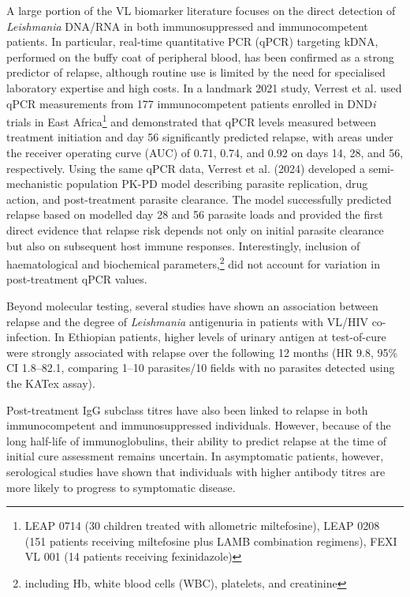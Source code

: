 A large portion of the VL biomarker literature focuses on the direct detection of \textit{Leishmania} DNA/RNA in both immunosuppressed\cite{antinori2007, bourgeois2008, cota2017, molina2013, nicodemo2013, verma2017} and immunocompetent patients\cite{hossain2017, mary2006, sudarshan2011, verrest2021, verrest2024}. In particular, real-time quantitative PCR (qPCR) targeting kDNA, performed on the buffy coat of peripheral blood, has been confirmed as a strong predictor of relapse\cite{hossain2017, sudarshan2011, verrest2021, verrest2024}, although routine use is limited by the need for specialised laboratory expertise and high costs. In a landmark 2021 study, Verrest et al. used qPCR measurements from 177 immunocompetent patients enrolled in DND\textit{i} trials in East Africa\footnote{LEAP 0714 (30 children treated with allometric miltefosine), LEAP 0208 (151 patients receiving miltefosine plus LAMB combination regimens), FEXI VL 001 (14 patients receiving fexinidazole)} and demonstrated that qPCR levels measured between treatment initiation and day 56 significantly predicted relapse, with areas under the receiver operating curve (AUC) of 0.71, 0.74, and 0.92 on days 14, 28, and 56, respectively\cite{verrest2021}. Using the same qPCR data, Verrest et al. (2024) developed a semi-mechanistic population PK-PD model describing parasite replication, drug action, and post-treatment parasite clearance. The model successfully predicted relapse based on modelled day 28 and 56 parasite loads and provided the first direct evidence that relapse risk depends not only on initial parasite clearance but also on subsequent host immune responses\cite{verrest2024}. Interestingly, inclusion of haematological and biochemical parameters,\footnote{including Hb, white blood cells (WBC), platelets, and creatinine} did not account for variation in post-treatment qPCR values.

Beyond molecular testing, several studies have shown an association between relapse and the degree of \textit{Leishmania} antigenuria in patients with VL/HIV co-infection\cite{vangriensven2018, riera2004}. In Ethiopian patients, higher levels of urinary antigen at test-of-cure were strongly associated with relapse over the following 12 months (HR 9.8, 95\% CI 1.8--82.1, comparing 1--10 parasites/10 fields with no parasites detected using the KATex assay).

Post-treatment IgG subclass titres have also been linked to relapse in both immunocompetent and immunosuppressed individuals\cite{bhattacharyya2014, mondal2019-serology, mollett2019, kuschnir2021}. However, because of the long half-life of immunoglobulins, their ability to predict relapse at the time of initial cure assessment remains uncertain. In asymptomatic patients, however, serological studies have shown that individuals with higher antibody titres are more likely to progress to symptomatic disease\cite{chapman2015, vangriensven2024_preleish}.

